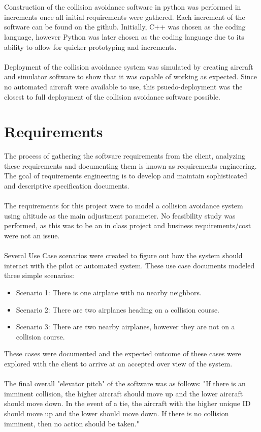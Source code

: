 \documentclass[12pt]{report}
\theoremstyle{plain}
\theoremstyle{definition}
\begin{document}
\\
\\
Construction of the collision avoidance software in python was performed in increments once all initial requirements were gathered.  Each increment of the software can be found on the github.  Initially, C++ was chosen as the coding language, however Python was later chosen as the coding language due to its ability to allow for quicker prototyping and increments.  
\\
\\
Deployment of the collision avoidance system was simulated by creating aircraft and simulator software to show that it was capable of working as expected.  Since no automated aircraft were available to use, this psuedo-deployment was the closest to full deployment of the collision avoidance software possible.

\section*{Requirements}
The process of gathering the software requirements from the client, analyzing these requirements and documenting them is known as requirements engineering. The goal of requirements engineering is to develop and maintain sophisticated and descriptive specification documents.\\
\\
The requirements for this project were to model a collision avoidance system using altitude as the main adjustment parameter. No feasibility study was performed, as this was to be an in class project and business requirements/cost were not an issue.\\
\\
Several Use Case scenarios were created to figure out how the system should interact with the pilot or automated system.  These use case documents modeled three simple scenarios:
\begin{itemize}
\item Scenario 1: There is one airplane with no nearby neighbors.
\item Scenario 2: There are two airplanes heading on a collision course.
\item Scenario 3: There are two nearby airplanes, however they are not on a collision course.
\end{itemize}
These cases were documented and the expected outcome of these cases were explored with the client to arrive at an accepted over view of the system.\\
\\
The final overall "elevator pitch" of the software was as follows: "If there is an imminent collision, the higher aircraft should move up and the lower aircraft should move down.  In the event of a tie, the aircraft with the higher unique ID should move up and the lower should move down.  If there is no collision imminent, then no action should be taken."
\end{document}
